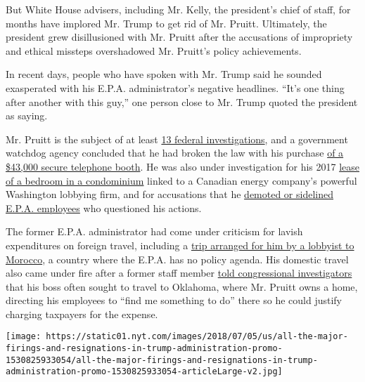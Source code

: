 But White House advisers, including Mr. Kelly, the president's chief of
staff, for months have implored Mr. Trump to get rid of Mr. Pruitt.
Ultimately, the president grew disillusioned with Mr. Pruitt after the
accusations of impropriety and ethical missteps overshadowed Mr.
Pruitt's policy achievements.

In recent days, people who have spoken with Mr. Trump said he sounded
exasperated with his E.P.A. administrator's negative headlines. ``It's
one thing after another with this guy,'' one person close to Mr. Trump
quoted the president as saying.

Mr. Pruitt is the subject of at least
\href{https://www.nytimes.com/2018/04/18/climate/scott-pruitt-epa-investigations-guide.html}{13
federal investigations}, and a government watchdog agency concluded that
he had broken the law with his purchase
\href{https://www.nytimes.com/2018/04/16/climate/scott-pruitt-phone-booth.html}{of
a \$43,000 secure telephone booth}. He was also under investigation for
his 2017
\href{https://www.nytimes.com/2018/03/30/climate/scott-pruitt-epa-rental.html}{lease
of a bedroom in a condominium} linked to a Canadian energy company's
powerful Washington lobbying firm, and for accusations that he
\href{https://www.nytimes.com/2018/04/05/business/epa-officials-questioned-scott-pruitt.html}{demoted
or sidelined E.P.A. employees} who questioned his actions.

The former E.P.A. administrator had come under criticism for lavish
expenditures on foreign travel, including a
\href{https://www.nytimes.com/2018/05/01/us/pruitt-epa-trips-lobbyists.html}{trip
arranged for him by a lobbyist to Morocco}, a country where the E.P.A.
has no policy agenda. His domestic travel also came under fire after a
former staff member
\href{https://www.nytimes.com/2018/04/12/climate/pruitt-epa-ethics-letter-congress.html}{told
congressional investigators} that his boss often sought to travel to
Oklahoma, where Mr. Pruitt owns a home, directing his employees to
``find me something to do'' there so he could justify charging taxpayers
for the expense.

\href{https://www.nytimes.com/interactive/2018/03/16/us/politics/all-the-major-firings-and-resignations-in-trump-administration.html}{}

\texttt{[image: https://static01.nyt.com/images/2018/07/05/us/all-the-major-firings-and-resignations-in-trump-administration-promo-1530825933054/all-the-major-firings-and-resignations-in-trump-administration-promo-1530825933054-articleLarge-v2.jpg]}

